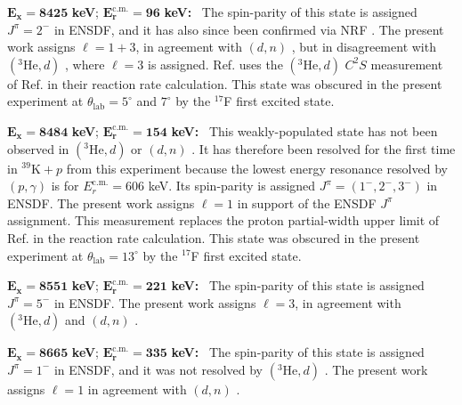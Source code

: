 \emph{$\mathbf{E_{x} = 8425}$} \textbf{keV}; \emph{$\mathbf{E^{\boldsymbol{\mathrm{c.m.}}}_{r} = 96}$} \textbf{keV:} \, 
The spin-parity of this state is assigned $J^{\pi} = 2^{-}$ in ENSDF, and it has also since been confirmed via NRF \cite{Gribble2022}. The present work assigns $\ell=1+3$, in agreement with $(d, n)$ \cite{Fuchs1969}, but in disagreement with $(^{3}\mathrm{He}, d)$ \cite{Erskine1966,Seth1967,Cage1971}, where $\ell=3$ is assigned. Ref. \cite{Longland2018} uses the $(^{3}\mathrm{He},d)$ $C^{2}S$ measurement of Ref. \cite{Cage1971} in their reaction rate calculation. This state was obscured in the present experiment at $\theta_{\mathrm{lab}} = 5^{\circ}$ and $7^{\circ}$ by the $^{17}$F first excited state.

\emph{$\mathbf{E_{x} = 8484}$} \textbf{keV}; \emph{$\mathbf{E^{\boldsymbol{\mathrm{c.m.}}}_{r} = 154}$} \textbf{keV:} \, 
This weakly-populated state has not been observed in $(^{3}\mathrm{He}, d)$ \cite{Erskine1966,Seth1967,Cage1971} or $(d, n)$ \cite{Fuchs1969}. It has therefore been resolved for the first time in $^{39}\mathrm{K}+p$ from this experiment because the lowest energy resonance resolved by $(p,\gamma)$ \cite{Kikstra1990,Cheng1981,Leenhouts1966} is for $E_{r}^{\mathrm{c.m.}} = 606$ keV. Its spin-parity is assigned $J^{\pi} = (1^{-},2^{-},3^{-})$ in ENSDF. The present work assigns $\ell=1$ in support of the ENSDF $J^{\pi}$ assignment. This measurement replaces the proton partial-width upper limit of Ref. \cite{Longland2018} in the reaction rate calculation. This state was obscured in the present experiment at $\theta_{\mathrm{lab}} = 13^{\circ}$ by the $^{17}$F first excited state.

\emph{$\mathbf{E_{x} = 8551}$} \textbf{keV}; \emph{$\mathbf{E^{\boldsymbol{\mathrm{c.m.}}}_{r} = 221}$} \textbf{keV:} \, 
The spin-parity of this state is assigned $J^{\pi} = 5^{-}$ in ENSDF. The present work assigns $\ell=3$, in agreement with $(^{3}\mathrm{He}, d)$ \cite{Erskine1966,Seth1967,Cage1971} and $(d, n)$ \cite{Fuchs1969}.

\emph{$\mathbf{E_{x} = 8665}$} \textbf{keV}; \emph{$\mathbf{E^{\boldsymbol{\mathrm{c.m.}}}_{r} = 335}$} \textbf{keV:} \, 
The spin-parity of this state is assigned $J^{\pi} = 1^{-}$ in ENSDF, and it was not resolved by $(^{3}\mathrm{He},d)$ \cite{Erskine1966,Seth1967,Cage1971}. The present work assigns $\ell=1$ in agreement with $(d, n)$ \cite{Fuchs1969}.

